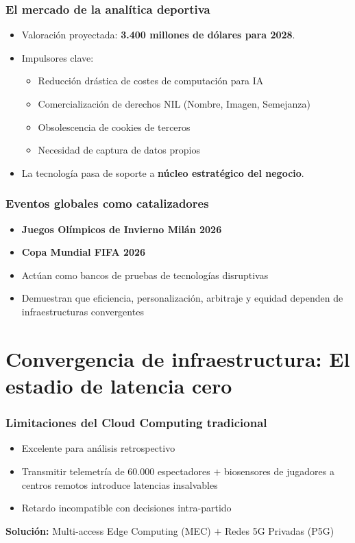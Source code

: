 \documentclass[aspectratio=169]{beamer}
\begin{document}
\begin{frame}\frametitle{El mercado de la analítica deportiva}
\begin{itemize}
    \item Valoración proyectada: \textbf{3.400 millones de dólares para 2028}.
    \item Impulsores clave:
    \begin{itemize}
        \item Reducción drástica de costes de computación para IA
        \item Comercialización de derechos NIL (Nombre, Imagen, Semejanza)
        \item Obsolescencia de cookies de terceros
        \item Necesidad de captura de datos propios
    \end{itemize}
    \item La tecnología pasa de soporte a \textbf{núcleo estratégico del negocio}.
\end{itemize}
\end{frame}

\begin{frame}\frametitle{Eventos globales como catalizadores}
\begin{itemize}
    \item \textbf{Juegos Olímpicos de Invierno Milán 2026}
    \item \textbf{Copa Mundial FIFA 2026}
    \item Actúan como bancos de pruebas de tecnologías disruptivas
    \item Demuestran que eficiencia, personalización, arbitraje y equidad dependen de infraestructuras convergentes
\end{itemize}
\end{frame}

\section{Convergencia de infraestructura: El estadio de latencia cero}
\frame{\sectionpage}

\begin{frame}\frametitle{Limitaciones del Cloud Computing tradicional}
\begin{itemize}
    \item Excelente para análisis retrospectivo
    \item Transmitir telemetría de 60.000 espectadores $+$ biosensores de jugadores a centros remotos introduce latencias insalvables
    \item Retardo incompatible con decisiones intra-partido
\end{itemize}
\textbf{Solución:} Multi-access Edge Computing (MEC) $+$ Redes 5G Privadas (P5G)
\end{frame}
\end{document}
